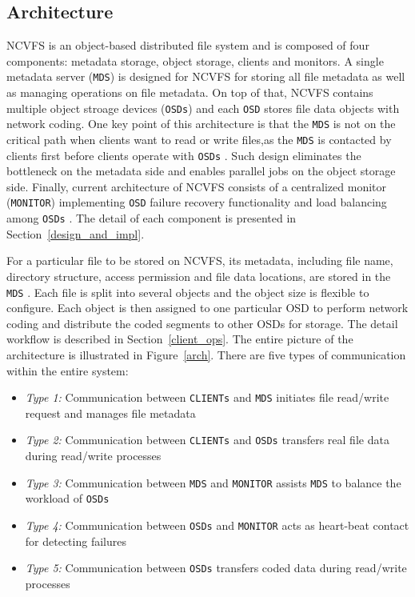 \documentclass{article}
\def\osd{\texttt{OSD} }
\def\osds{\texttt{OSDs} }
\def\mds{\texttt{MDS} }
\def\clients{\texttt{CLIENTs} }
\def\monitor{\texttt{MONITOR} }
\begin{document}
\subsection{Architecture}
NCVFS is an object-based distributed file system and is composed of 
four components: metadata storage,
object storage, clients and monitors. A single metadata server (\texttt{MDS}) 
is designed for NCVFS for 
storing all file metadata as well as managing operations on file 
metadata. On top of that, 
NCVFS contains multiple object stroage devices (\texttt{OSDs}) 
and each \osd stores file data objects with
network coding. One
key point of this architecture is that the \mds is not on the 
critical path when clients want to 
read or write files,as the \mds is contacted by clients first 
before clients operate with \osds. Such
design eliminates the bottleneck on the metadata side and enables 
parallel jobs on the object
storage side. Finally, current architecture of NCVFS consists of 
a centralized monitor (\texttt{MONITOR})
implementing \osd failure recovery functionality and load balancing among 
\osds. The detail of each component 
is presented in Section~\ref{design_and_impl}.

\drawArch

For a particular file to be stored on NCVFS, its metadata, including file
name, directory structure, access permission and file data locations, are stored
in the \mds . Each file is split into several objects and the object size is
flexible to
configure. Each object is then assigned to one particular OSD to perform network
coding and distribute the coded segments to other OSDs for storage. The detail
workflow is described in Section~\ref{client_ops}. The entire picture of the architecture is
illustrated in Figure~\ref{arch}. There are five types of communication within
the entire system:
\begin{itemize}
	\item[] \textit{Type 1:} Communication between \clients and \mds initiates file read/write request and manages file metadata
	\item[] \textit{Type 2:} Communication between \clients and \osds transfers real file data during read/write processes
	\item[] \textit{Type 3:} Communication between \mds and \monitor assists \mds to balance the workload of \osds
	\item[] \textit{Type 4:} Communication between \osds and \monitor acts as heart-beat contact for detecting failures
	\item[] \textit{Type 5:} Communication between \osds transfers coded data during read/write processes
\end{itemize}
\end{document}
